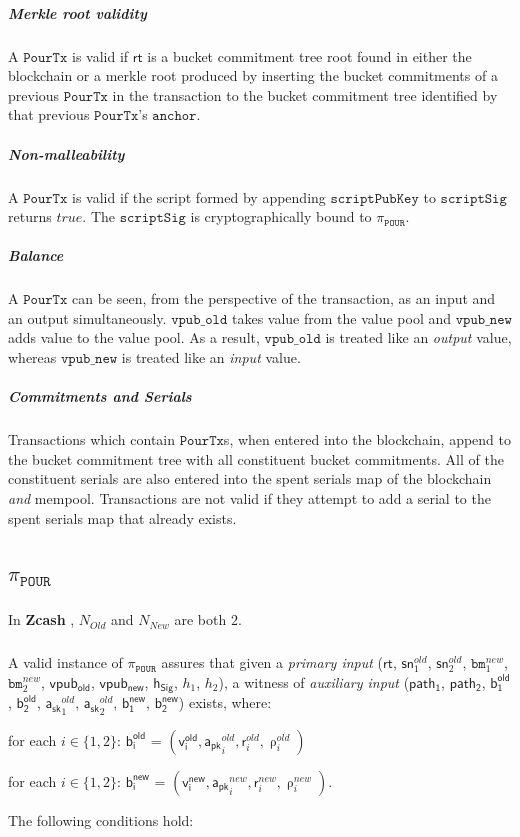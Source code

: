 \documentclass[8pt]{article}
\newcommand{\Zcash}{\textbf{Zcash} }
\newcommand{\SpendAuthorityPublic}{\mathsf{a_{pk}}}
\newcommand{\SpendAuthorityPrivate}{\mathsf{a_{sk}}}
\newcommand{\BucketRand}{\mathsf{r}}
\newcommand{\BucketAddressRand}{\mathsf{\uprho}}
\newcommand{\bm}{\mathbf{\mathtt{bm}}}
\newcommand{\PourTx}{\mathtt{PourTx}}
\newcommand{\sn}{\mathsf{sn}}
\newcommand{\vpubOld}{\mathtt{vpub\_old}}
\newcommand{\vpubNew}{\mathtt{vpub\_new}}
\newcommand{\anchor}{\mathtt{anchor}}
\newcommand{\scriptSig}{\mathtt{scriptSig}}
\newcommand{\scriptPubKey}{\mathtt{scriptPubKey}}
\newcommand{\rt}{\mathsf{rt}}
\newcommand{\hSig}{\mathsf{h_{Sig}}}
\newcommand{\Nold}{N_{Old}}
\newcommand{\Nnew}{N_{New}}
\newcommand{\PourStatement}{\texttt{POUR}}
\newcommand{\PourProof}{\pi_{\PourStatement}}
\newcommand{\vpubold}{\mathsf{vpub_{old}}}
\newcommand{\vpubnew}{\mathsf{vpub_{new}}}
\newcommand{\bOld}[1]{\mathsf{b_{#1}^{old}}}
\newcommand{\bNew}[1]{\mathsf{b_{#1}^{new}}}
\newcommand{\vOld}[1]{\mathsf{v_{#1}^{old}}}
\newcommand{\vNew}[1]{\mathsf{v_{#1}^{new}}}
\newcommand{\path}[1]{\mathsf{path_{#1}}}
\begin{document}
\subparagraph{Merkle root validity}

A $\PourTx$ is valid if $\rt$ is a bucket commitment tree root found in either the blockchain or a merkle root produced by inserting the bucket commitments of a previous $\PourTx$ in the transaction to the bucket commitment tree identified by that previous $\PourTx$'s $\anchor$.

\subparagraph{Non-malleability}

A $\PourTx$ is valid if the script formed by appending $\scriptPubKey$ to $\scriptSig$ returns $true$. The $\scriptSig$ is cryptographically bound to $\PourProof$.

\subparagraph{Balance}

A $\PourTx$ can be seen, from the perspective of the transaction, as an input and an output simultaneously. $\vpubOld$ takes value from the value pool and $\vpubNew$ adds value to the value pool. As a result, $\vpubOld$ is treated like an \textit{output} value, whereas $\vpubNew$ is treated like an \textit{input} value.

\subparagraph{Commitments and Serials}

Transactions which contain $\PourTx$s, when entered into the blockchain, append to the bucket commitment tree with all constituent bucket commitments. All of the constituent serials are also entered into the spent serials map of the blockchain \textit{and} mempool. Transactions are not valid if they attempt to add a serial to the spent serials map that already exists.

\subsection{$\PourProof$}

\subparagraph{}

In \Zcash, $\Nold$ and $\Nnew$ are both $2$.

\subparagraph{}

A valid instance of $\PourProof$ assures that given a \textit{primary input} ($\rt$, $\sn^{old}_{1}$, $\sn^{old}_{2}$, $\bm^{new}_{1}$, $\bm^{new}_{2}$, $\vpubold$, $\vpubnew$, $\hSig$, $h_1$, $h_2$), a witness of \textit{auxiliary input} ($\path{1}$, $\path{2}$, $\bOld{1}$, $\bOld{2}$, $\SpendAuthorityPrivate^{old}_1$, $\SpendAuthorityPrivate^{old}_2$, $\bNew{1}$, $\bNew{2}$) exists, where:

\begin{list}{}{}

\item for each $i \in \{1, 2\}$: $\bOld{i}$ = $(\vOld{i}, \SpendAuthorityPublic^{old}_i, \BucketRand^{old}_i, \BucketAddressRand^{old}_i)$

\item for each $i \in \{1, 2\}$: $\bNew{i}$ = $(\vNew{i}, \SpendAuthorityPublic^{new}_i, \BucketRand^{new}_i, \BucketAddressRand^{new}_i)$.

\item The following conditions hold:

\end{list}
\end{document}
